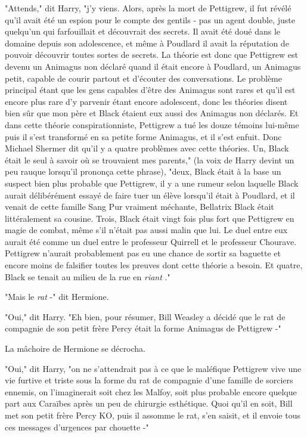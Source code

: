 "Attends," dit Harry, "j'y viens. Alors, après la mort de Pettigrew, il fut révélé qu'il avait été un espion pour le compte des gentils - pas un agent double, juste quelqu'un qui farfouillait et découvrait des secrets. Il avait été doué dans le domaine depuis son adolescence, et même à Poudlard il avait la réputation de pouvoir découvrir toutes sortes de secrets. La théorie est donc que Pettigrew est devenu un Animagus non déclaré quand il était encore à Poudlard, un Animagus petit, capable de courir partout et d'écouter des conversations. Le problème principal étant que les gens capables d'être des Animagus sont rares et qu'il est encore plus rare d'y parvenir étant encore adolescent, donc les théories disent bien sûr que mon père et Black étaient eux aussi des Animagus non déclarés. Et dans cette théorie conspirationniste, Pettigrew a tué les douze témoins lui-même puis il s'est transformé en sa petite forme Animagus, et il s'est enfuit. Donc Michael Shermer dit qu'il y a quatre problèmes avec cette théories. Un, Black était le seul à savoir où se trouvaient mes parents," (la voix de Harry devint un peu rauque lorsqu'il prononça cette phrase), "deux, Black était à la base un suspect bien plus probable que Pettigrew, il y a une rumeur selon laquelle Black aurait délibérément essayé de faire tuer un élève lorsqu'il était à Poudlard, et il venait de cette famille Sang Pur vraiment méchante, Bellatrix Black était littéralement sa cousine. Trois, Black était vingt fois plus fort que Pettigrew en magie de combat, même s'il n'était pas aussi malin que lui. Le duel entre eux aurait été comme un duel entre le professeur Quirrell et le professeur Chourave. Pettigrew n'aurait probablement pas eu une chance de sortir sa baguette et encore moins de falsifier toutes les preuves dont cette théorie a besoin. Et quatre, Black se tenait au milieu de la rue en \emph{riant} ."

"Mais le \emph{rat}  -" dit Hermione.

"Oui," dit Harry. "Eh bien, pour résumer, Bill Weasley a décidé que le rat de compagnie de son petit frère Percy était la forme Animagus de Pettigrew -"

La mâchoire de Hermione se décrocha.

"Oui," dit Harry, "on ne s'attendrait pas à ce que le maléfique Pettigrew vive une vie furtive et triste sous la forme du rat de compagnie d'une famille de sorciers ennemis, on l'imaginerait soit chez les Malfoy, soit plus probable encore quelque part aux Caraïbes après un peu de chirurgie esthétique. Quoi qu'il en soit, Bill met son petit frère Percy KO, puis il assomme le rat, s'en saisit, et il envoie tous ces messages d'urgences par chouette -"

